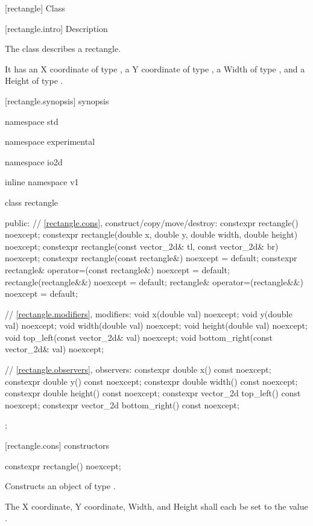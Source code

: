  [rectangle] {Class }

 [rectangle.intro] { Description}

\pnum
{}
The class  describes a rectangle.

\pnum
It has an X coordinate of type , a Y coordinate of type , a Width of type , and a Height of type .

 [rectangle.synopsis] { synopsis}

\begin{codeblock}
namespace std { namespace experimental { namespace io2d { inline namespace v1 {
  class rectangle {
  public:
    // \ref{rectangle.cons}, construct/copy/move/destroy:
    constexpr rectangle() noexcept;
    constexpr rectangle(double x, double y, double width, double height)
      noexcept;
    constexpr rectangle(const vector_2d& tl, const vector_2d& br) noexcept;
    constexpr rectangle(const rectangle&) noexcept = default;
    constexpr rectangle& operator=(const rectangle&) noexcept = default;
    rectangle(rectangle&&) noexcept = default;
    rectangle& operator=(rectangle&&) noexcept = default;

    // \ref{rectangle.modifiers}, modifiers:
    void x(double val) noexcept;
    void y(double val) noexcept;
    void width(double val) noexcept;
    void height(double val) noexcept;
    void top_left(const vector_2d& val) noexcept;
    void bottom_right(const vector_2d& val) noexcept;
    
    // \ref{rectangle.observers}, observers:
    constexpr double x() const noexcept;
    constexpr double y() const noexcept;
    constexpr double width() const noexcept;
    constexpr double height() const noexcept;
    constexpr vector_2d top_left() const noexcept;
    constexpr vector_2d bottom_right() const noexcept;
  };
} } } }
\end{codeblock}

 [rectangle.cons] { constructors}

\begin{itemdecl}
constexpr rectangle() noexcept;
\end{itemdecl}
\begin{itemdescr}
\pnum
\effects
Constructs an object of type .

\pnum
The X coordinate, Y coordinate, Width, and Height shall each be set to the value .
\end{itemdescr}

